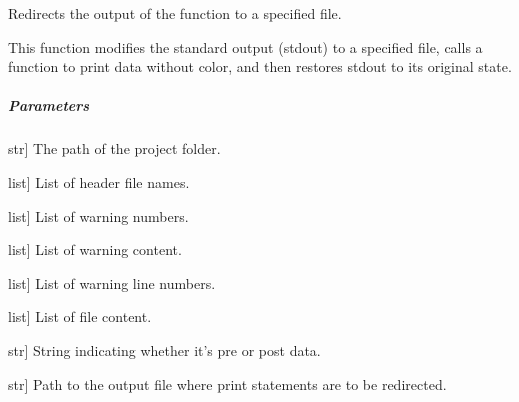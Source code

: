 \documentclass[letterpaper,10pt,english]{sphinxmanual}
\begin{document}
\begin{fulllineitems}
\begin{fulllineitems}
\label{\detokenize{main.doxygen_management:main.doxygen_management.file_handler.FileHandler.redirect_print_to_file}}
\pysigstartsignatures
{}
\pysigstopsignatures
\sphinxAtStartPar
Redirects the output of the  function to a specified file.

\sphinxAtStartPar
This function modifies the standard output (stdout) to a specified file,
calls a function to print data without color, and then restores stdout to its original state.


\subparagraph{Parameters}
\label{\detokenize{main.doxygen_management:id25}}\begin{description}
\sphinxlineitem{project\_folder\_path}{[}str{]}
\sphinxAtStartPar
The path of the project folder.

\sphinxlineitem{header\_file\_name\_list}{[}list{]}
\sphinxAtStartPar
List of header file names.

\sphinxlineitem{warning\_num\_list}{[}list{]}
\sphinxAtStartPar
List of warning numbers.

\sphinxlineitem{warning\_content\_llist}{[}list{]}
\sphinxAtStartPar
List of warning content.

\sphinxlineitem{warning\_line\_number\_llist}{[}list{]}
\sphinxAtStartPar
List of warning line numbers.

\sphinxlineitem{file\_content\_list}{[}list{]}
\sphinxAtStartPar
List of file content.

\sphinxlineitem{pre\_or\_post}{[}str{]}
\sphinxAtStartPar
String indicating whether it’s pre or post data.

\sphinxlineitem{output\_file}{[}str{]}
\sphinxAtStartPar
Path to the output file where print statements are to be redirected.


\end{description}
\end{fulllineitems}
\end{fulllineitems}
\end{document}

